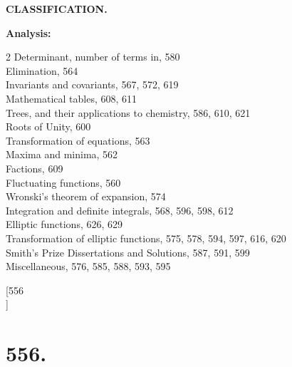 \documentclass[12pt,a4paper]{article}
\theoremstyle{plain}
\theoremstyle{definition}
\begin{document}
\newpage
\setcounter{page}{16}

\begin{center}
{\large \textbf{CLASSIFICATION.}}
\end{center}

\vspace{12pt}

\noindent \textbf{Analysis:}

\begin{multicols}{2}
Determinant, number of terms in, 580\\
Elimination, 564\\
Invariants and covariants, 567, 572, 619\\
Mathematical tables, 608, 611\\
Trees, and their applications to chemistry, 586, 610, 621\\
Roots of Unity, 600\\
Transformation of equations, 563\\
Maxima and minima, 562\\
Factions, 609\\
Fluctuating functions, 560\\
Wronski's theorem of expansion, 574\\
Integration and definite integrals, 568, 596, 598, 612\\
Elliptic functions, 626, 629\\
Transformation of elliptic functions, 575, 578, 594, 597, 616, 620\\
Smith's Prize Dissertations and Solutions, 587, 591, 599\\
Miscellaneous, 576, 585, 588, 593, 595\\
\end{multicols}


\newpage
\setcounter{page}{1}

\begin{center}
[556\\
]
\end{center}

\section*{\textbf{556.}}
\end{document}
